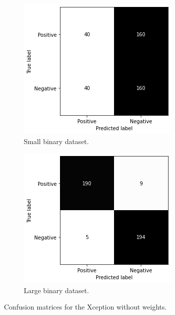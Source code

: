 \begin{figure}
    \centering
    \begin{subfigure}[b]{0.49\textwidth}
        \centering
        \includegraphics[width=\textwidth]{figures/cm-n-weight-s-b.png}
        \caption{Small binary dataset.}
        \label{fig:cm-n-weight-s-b}
    \end{subfigure}
    \hfill
    \begin{subfigure}[b]{0.49\textwidth}
        \centering
        \includegraphics[width=\textwidth]{figures/cm-n-weight-l-b.png}
        \caption{Large binary dataset.}
        \label{fig:cm-n-weight-l-b}
    \end{subfigure}
    \caption{Confusion matrices for the Xception without weights.}
    \label{fig:cm-no-weights}
\end{figure}


